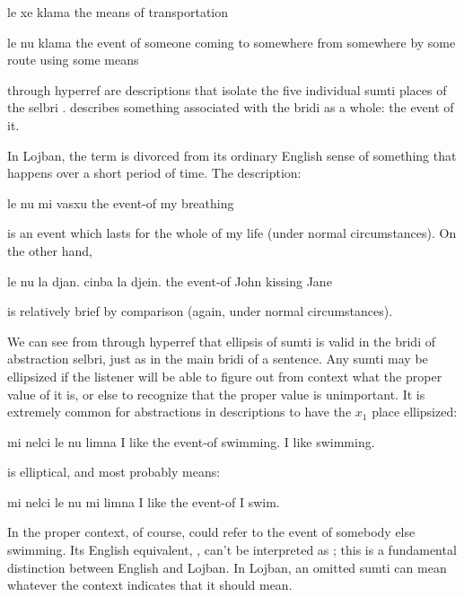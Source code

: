 \begin{example}
le xe klama\n
the means of transportation
\end{example}

\begin{example}
le nu klama\n
the event of someone coming to somewhere\n
\T	from somewhere by some route using some means
\end{example}

 through hyperref are descriptions that isolate the five
    individual sumti places of the selbri .  describes something associated
    with the bridi as a whole: the event of it. 

In Lojban, the term  is divorced from its ordinary
    English sense of something that happens over a short period of
    time. The description:
\begin{example}
le nu mi vasxu\n
the event-of my breathing
\end{example}

{\noindent}is an event which lasts for the whole of my life (under normal
    circumstances). On the other hand,
\begin{example}
le nu la djan. cinba la djein.\n
the event-of John kissing Jane
\end{example}

{\noindent}is relatively brief by comparison (again, under normal
    circumstances). 

We can see from  through
    hyperref that ellipsis of sumti is valid in the
    bridi of abstraction selbri, just as in the main bridi of a
    sentence. Any sumti may be ellipsized if the listener will be
    able to figure out from context what the proper value of it is,
    or else to recognize that the proper value is unimportant. It
    is extremely common for  abstractions in descriptions to
    have the $x_1$ place ellipsized:
\begin{example}
mi nelci le nu limna\n
I like the event-of swimming.\n
I like swimming.
\end{example}

{\noindent}is elliptical, and most probably means:
\begin{example}
mi nelci le nu mi limna\n
I like the event-of I swim.
\end{example}

In the proper context, of course,  could refer to the event of somebody else swimming. Its
    English equivalent, , can't be interpreted
    as ; this is a fundamental
    distinction between English and Lojban. In Lojban, an omitted
    sumti can mean whatever the context indicates that it should
    mean.

